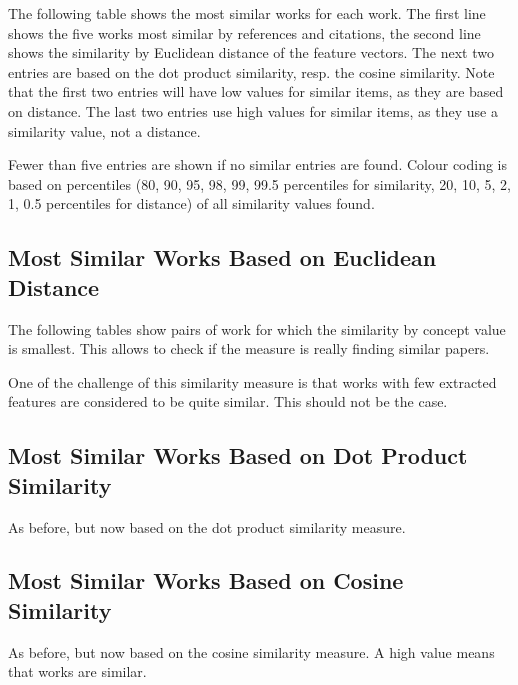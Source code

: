 \documentclass[a4paper]{article}
\begin{document}
The following table shows the most similar works for each work. The first line shows the five works most similar by references and citations, the second line shows the similarity by Euclidean distance of the feature vectors. The next two entries are based on the dot product similarity, resp. the cosine similarity. Note that the first two entries will have low values for similar items, as they are based on distance. The last two entries use high values for similar items, as they use a similarity value, not a distance.

Fewer than five entries are shown if no similar entries are found. Colour coding is based on percentiles (80, 90, 95, 98, 99, 99.5 percentiles for similarity, 20, 10, 5, 2, 1, 0.5 percentiles for distance) of all similarity values found.



\clearpage
\subsection{Most Similar Works Based on Euclidean Distance}

The following tables show pairs of work for which the similarity by concept value is smallest. This allows to check if the measure is really finding similar papers.

One of the challenge of this similarity measure is that works with few extracted features are considered to be quite similar. This should not be the case.





\clearpage
\subsection{Most Similar Works Based on Dot Product Similarity}

As before, but now based on the dot product similarity measure.





\clearpage
\subsection{Most Similar Works Based on Cosine Similarity}
As before, but now based on the cosine similarity measure. A high value means that works are similar.
\end{document}
